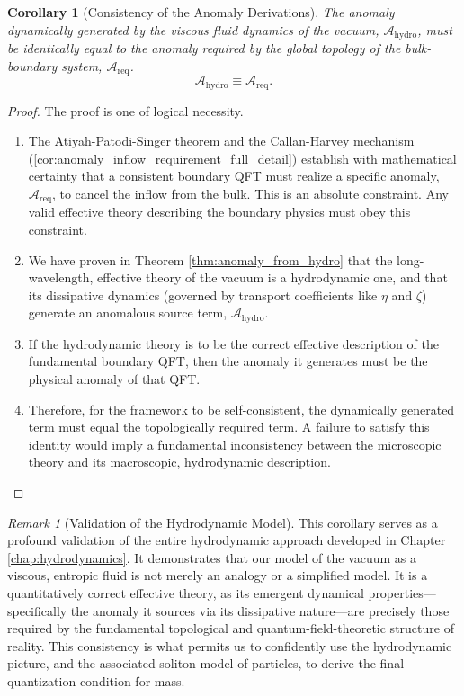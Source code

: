 \documentclass[11pt, letterpaper]{report}
\theoremstyle{plain} %
\newtheorem{corollary}[theorem]{Corollary}
\theoremstyle{definition} %
\theoremstyle{remark} %
\newtheorem{remark}{Remark}[chapter]
\begin{document}
\begin{corollary}[Consistency of the Anomaly Derivations]
\label{cor:consistency_anomaly_pictures}
The anomaly dynamically generated by the viscous fluid dynamics of the vacuum, $\mathcal{A}_{\text{hydro}}$, must be identically equal to the anomaly required by the global topology of the bulk-boundary system, $\mathcal{A}_{\text{req}}$.
\begin{equation}
    \mathcal{A}_{\text{hydro}} \equiv \mathcal{A}_{\text{req}}.
\end{equation}
\end{corollary}
\begin{proof}
The proof is one of logical necessity.
\begin{enumerate}
    \item The Atiyah-Patodi-Singer theorem and the Callan-Harvey mechanism (\cref{cor:anomaly_inflow_requirement_full_detail}) establish with mathematical certainty that a consistent boundary QFT must realize a specific anomaly, $\mathcal{A}_{\text{req}}$, to cancel the inflow from the bulk. This is an absolute constraint. Any valid effective theory describing the boundary physics must obey this constraint.
    \item We have proven in Theorem \ref{thm:anomaly_from_hydro} that the long-wavelength, effective theory of the vacuum is a hydrodynamic one, and that its dissipative dynamics (governed by transport coefficients like $\eta$ and $\zeta$) generate an anomalous source term, $\mathcal{A}_{\text{hydro}}$.
    \item If the hydrodynamic theory is to be the correct effective description of the fundamental boundary QFT, then the anomaly it generates must be the physical anomaly of that QFT.
    \item Therefore, for the framework to be self-consistent, the dynamically generated term must equal the topologically required term. A failure to satisfy this identity would imply a fundamental inconsistency between the microscopic theory and its macroscopic, hydrodynamic description.
\end{enumerate}
\end{proof}

\begin{remark}[Validation of the Hydrodynamic Model]
This corollary serves as a profound validation of the entire hydrodynamic approach developed in Chapter \ref{chap:hydrodynamics}. It demonstrates that our model of the vacuum as a viscous, entropic fluid is not merely an analogy or a simplified model. It is a quantitatively correct effective theory, as its emergent dynamical properties—specifically the anomaly it sources via its dissipative nature—are precisely those required by the fundamental topological and quantum-field-theoretic structure of reality. This consistency is what permits us to confidently use the hydrodynamic picture, and the associated soliton model of particles, to derive the final quantization condition for mass.
\end{remark}
\end{document}
